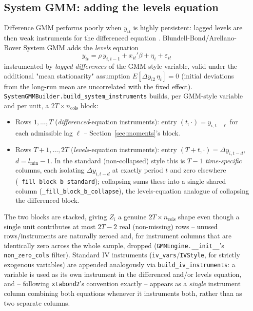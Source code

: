 \documentclass[11pt,a4paper]{article}
\begin{document}
\subsection{System GMM: adding the levels equation}
\label{sec:system}

Difference GMM performs poorly when $y_{it}$ is highly persistent: lagged
levels are then weak instruments for the differenced equation
\citep{BlundellBond1998}. Blundell-Bond/Arellano-Bover System GMM adds the
\emph{levels} equation
\[
  y_{it} = \rho\, y_{i,t-1} + x_{it}'\beta + \eta_i + \varepsilon_{it}
\]
instrumented by \emph{lagged differences} of the GMM-style variable, valid
under the additional "mean stationarity" assumption
$E[\Delta y_{i2}\,\eta_i]=0$ (initial deviations from the long-run mean are
uncorrelated with the fixed effect). \texttt{SystemGMMBuilder.build\_system\_instruments}
builds, per GMM-style variable and per unit, a $2T\times n_{\text{cols}}$
block:
\begin{itemize}[nosep]
  \item Rows $1,\dots,T$ (\emph{differenced}-equation instruments): entry
    $(t,\cdot)=y_{i,t-\ell}$ for each admissible lag $\ell$ -- Section~\ref{sec:moments}'s block.
  \item Rows $T+1,\dots,2T$ (\emph{levels}-equation instruments): entry
    $(T+t,\cdot)=\Delta y_{i,t-d}$, $d=l_{\min}-1$. In the standard
    (non-collapsed) style this is $T-1$ \emph{time-specific} columns, each
    isolating $\Delta y_{i,t-d}$ at exactly period $t$ and zero elsewhere
    (\texttt{\_fill\_block\_b\_standard}); collapsing sums these into a
    single shared column (\texttt{\_fill\_block\_b\_collapse}), the levels-equation
    analogue of collapsing the differenced block.
\end{itemize}
The two blocks are stacked, giving $Z_i$ a genuine $2T\times n_{\text{cols}}$
shape even though a single unit contributes at most $2T-2$ real (non-missing)
rows -- unused rows/instruments are naturally zeroed and, for instrument
columns that are identically zero across the whole sample, dropped
(\texttt{GMMEngine.\_\_init\_\_}'s \texttt{non\_zero\_cols} filter). Standard
IV instruments (\texttt{iv\_vars}/\texttt{IVStyle}, for strictly exogenous
variables) are appended analogously via \texttt{build\_iv\_instruments}: a
variable is used as its own instrument in the differenced and/or levels
equation, and -- following \texttt{xtabond2}'s convention exactly --
appears as a \emph{single} instrument column combining both equations
whenever it instruments both, rather than as two separate columns.
\end{document}
